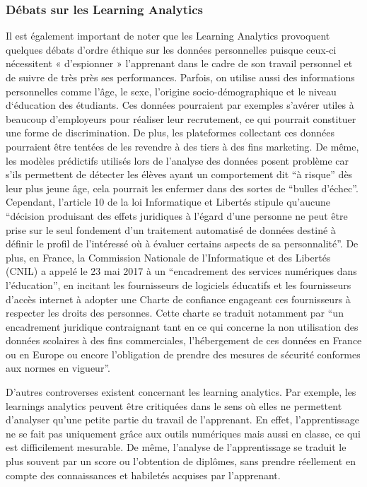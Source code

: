         \subsubsection{Débats sur les Learning Analytics}
    
            Il est également important de noter que les Learning Analytics provoquent quelques débats d’ordre éthique sur les données personnelles puisque ceux-ci nécessitent « d’espionner » l’apprenant dans le cadre de son travail personnel et de suivre de très près ses performances. Parfois, on utilise aussi des informations personnelles comme l’âge, le sexe, l’origine socio-démographique et le niveau  d‘éducation des étudiants. Ces données pourraient par exemples s’avérer utiles à beaucoup d’employeurs pour réaliser leur recrutement, ce qui pourrait constituer une forme de discrimination. De plus, les plateformes collectant ces données pourraient être tentées de les revendre à des tiers à des fins marketing. De même, les modèles prédictifs utilisés lors de l’analyse des données posent problème car s’ils permettent de détecter les élèves ayant un comportement dit “à risque” dès leur plus jeune âge, cela pourrait les enfermer dans des sortes de “bulles d’échec”. Cependant, l’article 10 de la loi Informatique et Libertés stipule qu’aucune “décision produisant des effets juridiques à l’égard d’une personne ne peut être prise sur le seul fondement d’un traitement automatisé de données destiné à définir le profil de l’intéressé où à évaluer certains aspects de sa personnalité”. De plus, en France, la Commission Nationale de l’Informatique et des Libertés (CNIL) a appelé le 23 mai 2017 à un “encadrement des services numériques dans l’éducation”, en incitant les fournisseurs de logiciels éducatifs et les fournisseurs d’accès internet à adopter une Charte de confiance engageant ces fournisseurs à respecter les droits des personnes. Cette charte se traduit notamment par “un encadrement juridique contraignant tant en ce qui concerne la non utilisation des données scolaires à des fins commerciales, l’hébergement de ces données en France ou en Europe ou encore l’obligation de prendre des mesures de sécurité conformes aux normes en vigueur”.
        
            D’autres controverses existent concernant les learning analytics. Par exemple, les learnings analytics peuvent être critiquées dans le sens où elles ne permettent d’analyser qu’une petite partie du travail de l’apprenant. En effet, l’apprentissage ne se fait pas uniquement grâce aux outils numériques mais aussi en classe, ce qui est difficilement mesurable. De même, l’analyse de l’apprentissage se traduit le plus souvent par un score ou l’obtention de diplômes, sans prendre réellement en compte des connaissances et habiletés acquises par l’apprenant.
        
